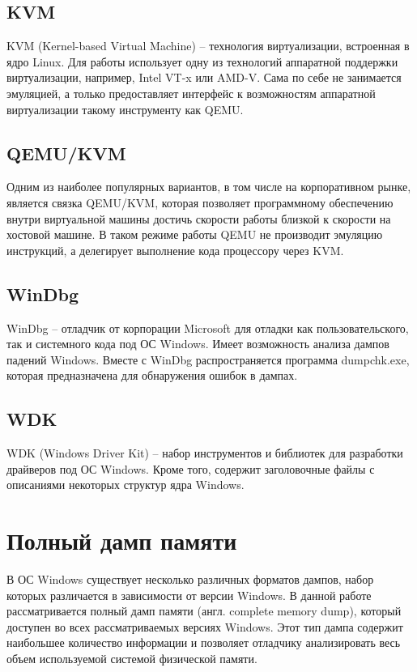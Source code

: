 \documentclass{mipt-thesis-bs}
\begin{document}
\section*{KVM}

KVM (Kernel-based Virtual Machine) -- технология виртуализации, встроенная в ядро Linux. Для работы использует одну из технологий аппаратной поддержки виртуализации, например, Intel VT-x или AMD-V. Сама по себе не занимается эмуляцией, а только предоставляет интерфейс к возможностям аппаратной виртуализации такому инструменту как QEMU.

\section*{QEMU/KVM}
Одним из наиболее популярных вариантов, в том числе на корпоративном рынке, является связка QEMU/KVM, которая позволяет программному обеспечению внутри виртуальной машины достичь скорости работы близкой к скорости на хостовой машине. В таком режиме работы QEMU не производит эмуляцию инструкций, а делегирует выполнение кода процессору через KVM.

\section*{WinDbg}

WinDbg -- отладчик от корпорации Microsoft для отладки как пользовательского, так и системного кода под ОС Windows. Имеет возможность анализа дампов падений Windows. Вместе с WinDbg распространяется программа dumpchk.exe, которая предназначена для обнаружения ошибок в дампах.

\section*{WDK}

WDK (Windows Driver Kit) -- набор инструментов и библиотек для разработки драйверов под ОС Windows. Кроме того, содержит заголовочные файлы с описаниями некоторых структур ядра Windows.

\chapter{Полный дамп памяти}

В ОС Windows существует несколько различных форматов дампов, набор которых различается в зависимости от версии Windows\cite{dumps}. В данной работе рассматривается полный дамп памяти (англ. complete memory dump), который доступен во всех рассматриваемых версиях Windows. Этот тип дампа содержит наибольшее количество информации и позволяет отладчику анализировать весь объем используемой системой физической памяти\cite{completedump}.
\end{document}
